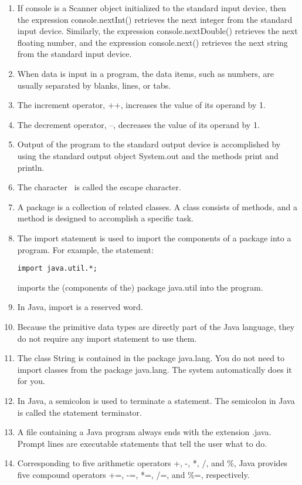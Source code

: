 \documentclass[12pt,a4paper,final,twoside,onecolumn,titlepage]{book}
\begin{document}
\begin{enumerate}
\item If console is a Scanner object initialized to the standard input device, then the expression console.nextInt() retrieves the next integer from the standard input device. Similarly, the expression console.nextDouble() retrieves the next floating number, and the expression console.next() retrieves the next string from the standard input device.
\item When data is input in a program, the data items, such as numbers, are usually separated by blanks, lines, or tabs.
\item The increment operator, ++, increases the value of its operand by 1.
\item The decrement operator, --, decreases the value of its operand by 1.
\item Output of the program to the standard output device is accomplished by using the standard output object System.out and the methods print and println.
\item The character \ is called the escape character.
\item A package is a collection of related classes. A class consists of methods, and a method is designed to accomplish a specific task.
\item The import statement is used to import the components of a package into a program. For example, the statement:
\begin{lstlisting}
import java.util.*;
\end{lstlisting}
imports the (components of the) package java.util into the program.
\item In Java, import is a reserved word.
\item Because the primitive data types are directly part of the Java language, they do not require any import statement to use them.
\item The class String is contained in the package java.lang. You do not need to import classes from the package java.lang. The system automatically does it for you.
\item In Java, a semicolon is used to terminate a statement. The semicolon in Java is called the statement terminator.
\item A file containing a Java program always ends with the extension .java. Prompt lines are executable statements that tell the user what to do.
\item Corresponding to five arithmetic operators +, -, *, /, and \%, Java provides five compound operators +=, -=, *=, /=, and \%=, respectively.

\end{enumerate}
\end{document}
